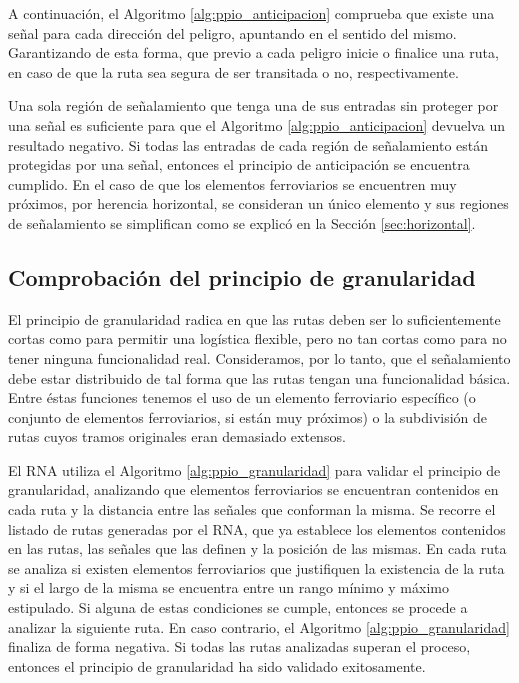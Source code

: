 		A continuación, el Algoritmo \ref{alg:ppio_anticipacion} comprueba que existe una señal para cada dirección del peligro, apuntando en el sentido del mismo. Garantizando de esta forma, que previo a cada peligro inicie o finalice una ruta, en caso de que la ruta sea segura de ser transitada o no, respectivamente.
		
		Una sola región de señalamiento que tenga una de sus entradas sin proteger por una señal es suficiente para que el Algoritmo \ref{alg:ppio_anticipacion} devuelva un resultado negativo. Si todas las entradas de cada región de señalamiento están protegidas por una señal, entonces el principio de anticipación se encuentra cumplido. En el caso de que los elementos ferroviarios se encuentren muy próximos, por herencia horizontal, se consideran un único elemento y sus regiones de señalamiento se simplifican como se explicó en la Sección \ref{sec:horizontal}.
		
	\subsection{Comprobación del principio de granularidad}
		
		El principio de granularidad radica en que las rutas deben ser lo suficientemente cortas como para permitir una logística flexible, pero no tan cortas como para no tener ninguna funcionalidad real. Consideramos, por lo tanto, que el señalamiento debe estar distribuido de tal forma que las rutas tengan una funcionalidad básica. Entre éstas funciones tenemos el uso de un elemento ferroviario específico (o conjunto de elementos ferroviarios, si están muy próximos) o la subdivisión de rutas cuyos tramos originales eran demasiado extensos.
		
		El RNA utiliza el Algoritmo \ref{alg:ppio_granularidad} para validar el principio de granularidad, analizando que elementos ferroviarios se encuentran contenidos en cada ruta y la distancia entre las señales que conforman la misma. Se recorre el listado de rutas generadas por el RNA, que ya establece los elementos contenidos en las rutas, las señales que las definen y la posición de las mismas. En cada ruta se analiza si existen elementos ferroviarios que justifiquen la existencia de la ruta y si el largo de la misma se encuentra entre un rango mínimo y máximo estipulado. Si alguna de estas condiciones se cumple, entonces se procede a analizar la siguiente ruta. En caso contrario, el Algoritmo \ref{alg:ppio_granularidad} finaliza de forma negativa. Si todas las rutas analizadas superan el proceso, entonces el principio de granularidad ha sido validado exitosamente.
		
